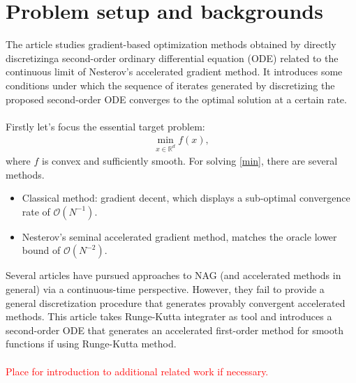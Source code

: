 

\section{Problem setup and backgrounds}

The article studies gradient-based optimization methods obtained by directly
discretizinga second-order ordinary differential equation (ODE) related to the
continuous limit of Nesterov's accelerated gradient method. It introduces some
conditions under which the sequence of iterates generated by discretizing the
proposed second-order ODE converges to the optimal solution at a certain rate.\\\\
Firstly let's focus the essential target problem:
\begin{align}\label{min}
  \mathop{\mathrm{min}}\limits_{x \in \mathbb{R}^{d}} f(x),
\end{align}
where $f$ is convex and sufficiently smooth. For solving \eqref{min}, there are several
methods.
\begin{itemize}
  \item Classical method: gradient decent, which displays a sub-optimal convergence rate of $\mathcal{O}(N^{-1})$.
  \item Nesterov's seminal accelerated gradient method, matches the oracle lower bound of $\mathcal{O}(N^{-2})$.
\end{itemize}
Several articles have pursued approaches to NAG (and accelerated methods in general)
via a continuous-time perspective. However, they fail to provide a general
discretization procedure that generates provably convergent accelerated methods.
This article takes Runge-Kutta integrater as tool and introduces a second-order ODE
that generates an accelerated first-order method for smooth functions if using
Runge-Kutta method.\\\\
\textcolor{red}{Place for introduction to additional related work if necessary.}

